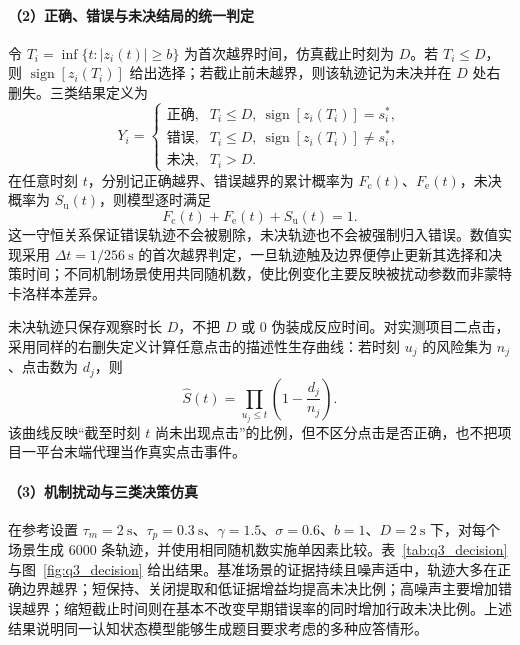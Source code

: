 \documentclass[a4paper,zihao=-4,linespread=1]{ctexart}
\numberwithin{figure}{section}       %
\begin{document}
\paragraph{（2）正确、错误与未决结局的统一判定}

令 $T_i=\inf\{t:|z_i(t)|\ge b\}$ 为首次越界时间，仿真截止时刻为 $D$。若 $T_i\le D$，则 $\operatorname{sign}[z_i(T_i)]$ 给出选择；若截止前未越界，则该轨迹记为未决并在 $D$ 处右删失。三类结果定义为
\begin{equation}
Y_i=
\begin{cases}
\text{正确}, & T_i\le D,\ \operatorname{sign}[z_i(T_i)]=s_i^*,\\
\text{错误}, & T_i\le D,\ \operatorname{sign}[z_i(T_i)]\ne s_i^*,\\
\text{未决}, & T_i>D.
\end{cases}
\tag{3-10}
\label{eq:q3_outcome}
\end{equation}
在任意时刻 $t$，分别记正确越界、错误越界的累计概率为 $F_{\mathrm c}(t)$、$F_{\mathrm e}(t)$，未决概率为 $S_{\mathrm u}(t)$，则模型逐时满足
\[
F_{\mathrm c}(t)+F_{\mathrm e}(t)+S_{\mathrm u}(t)=1.
\]
这一守恒关系保证错误轨迹不会被剔除，未决轨迹也不会被强制归入错误。数值实现采用 $\Delta t=1/256~\mathrm{s}$ 的首次越界判定，一旦轨迹触及边界便停止更新其选择和决策时间；不同机制场景使用共同随机数，使比例变化主要反映被扰动参数而非蒙特卡洛样本差异。

未决轨迹只保存观察时长 $D$，不把 $D$ 或 0 伪装成反应时间。对实测项目二点击，采用同样的右删失定义计算任意点击的描述性生存曲线：若时刻 $u_j$ 的风险集为 $n_j$、点击数为 $d_j$，则
\begin{equation}
\widehat S(t)=\prod_{u_j\le t}\left(1-\frac{d_j}{n_j}\right).
\tag{3-11}
\label{eq:q3_survival}
\end{equation}
该曲线反映“截至时刻 $t$ 尚未出现点击”的比例，但不区分点击是否正确，也不把项目一平台末端代理当作真实点击事件。

\paragraph{（3）机制扰动与三类决策仿真}

在参考设置 $\tau_m=2~\mathrm{s}$、$\tau_p=0.3~\mathrm{s}$、$\gamma=1.5$、$\sigma=0.6$、$b=1$、$D=2~\mathrm{s}$ 下，对每个场景生成 6000 条轨迹，并使用相同随机数实施单因素比较。表~\ref{tab:q3_decision} 与图~\ref{fig:q3_decision} 给出结果。基准场景的证据持续且噪声适中，轨迹大多在正确边界越界；短保持、关闭提取和低证据增益均提高未决比例；高噪声主要增加错误越界；缩短截止时间则在基本不改变早期错误率的同时增加行政未决比例。上述结果说明同一认知状态模型能够生成题目要求考虑的多种应答情形。
\end{document}
